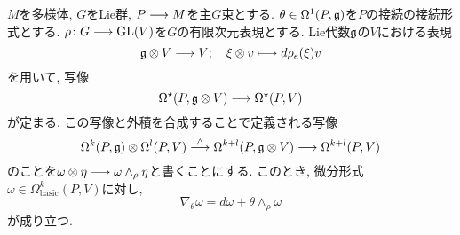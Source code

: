 \begin{thm}
\label{covariant-exterior-derivative-explicit-formula-total-space}
$M$を多様体, $G$をLie群, $P \longrightarrow M$を主$G$束とする.
$\theta \in \Omega^1(P, \mathfrak{g})$を$P$の接続の接続形式とする.
$\rho \colon G \longrightarrow \operatorname{GL}(V)$を$G$の有限次元表現とする.
Lie代数$\mathfrak{g}$の$V$における表現
\begin{equation}
\mathfrak{g} \otimes V \longrightarrow V; \quad \xi \otimes v \longmapsto d\rho_e(\xi)v
\end{equation}
を用いて, 写像
\begin{equation}
\label{Lie-algebra-valued-form-wedge-representation-space-valued-form}
\Omega^\star(P, \mathfrak{g} \otimes V) \longrightarrow \Omega^\star(P, V)
\end{equation}
が定まる.
この写像と外積を合成することで定義される写像
\begin{equation}
\Omega^k(P, \mathfrak{g}) \otimes \Omega^l(P, V) \stackrel{\wedge}{\longrightarrow}
\Omega^{k+l}(P, \mathfrak{g} \otimes V) \longrightarrow
\Omega^{k+l}(P, V)
\end{equation}
のことを$\omega \otimes \eta \longrightarrow \omega \wedge_\rho \eta$と書くことにする.
このとき,
微分形式$\omega \in \Omega^k_{\mathrm{basic}}(P, V)$に対し,
\begin{equation}
\nabla_\theta \omega = d \omega + \theta \wedge_\rho \omega
\end{equation}
が成り立つ.
\end{thm}


